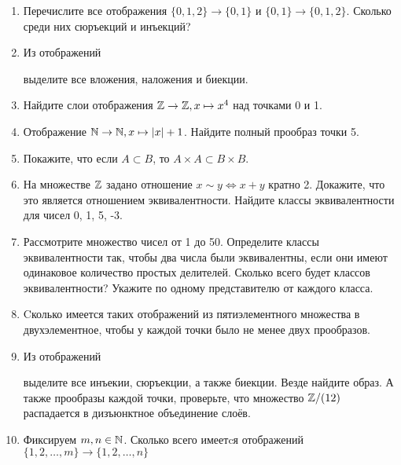 \begin{enumerate}
    \item Перечислите все отображения $\{0, 1, 2\} \to \{0, 1\}$ и $\{0, 1\} \to \{0, 1, 2\}$. Сколько среди них сюръекций и инъекций?
    \item Из отображений  выделите все вложения, наложения и биекции.
    \item Найдите слои отображения $\mathbb Z \to \mathbb Z, x \mapsto x^4$ над точками 0 и 1.
    \item Отображение $\mathbb N \to \mathbb N, x \mapsto |x| + 1$. Найдите полный прообраз точки 5.  
    \item Покажите, что если $A \subset B$, то $A \times A \subset B \times B$. 
    \item На множестве $\mathbb Z$ задано отношение $x \sim y \iff x + y$ кратно 2. Докажите, что это является отношением эквивалентности. Найдите классы эквивалентности для чисел 0, 1, 5, -3.
    \item Рассмотрите множество чисел от 1 до 50. Определите классы эквивалентности так, чтобы два числа были эквивалентны, если они имеют одинаковое количество простых делителей. Сколько всего будет классов эквивалентности? Укажите по одному представителю от каждого класса. 
    \item Cколько имеется таких отображений из пятиэлементного множества в двухэлементное, чтобы у каждой точки было не менее двух прообразов.
    \item Из отображений  выделите все инъекии, сюръекции, а также биекции. Везде найдите образ. А также прообразы каждой точки, проверьте, что множество $\mathbb Z/(12)$ распадается в дизъюнктное объединение слоёв.
    \item Фиксируем $m, n \in \mathbb N$. Сколько всего имеетcя отображений $\{1, 2, \ldots, m\} \to \{1, 2, \ldots, n\}$ \begin{inumerate}

\end{inumerate}
\end{enumerate}
